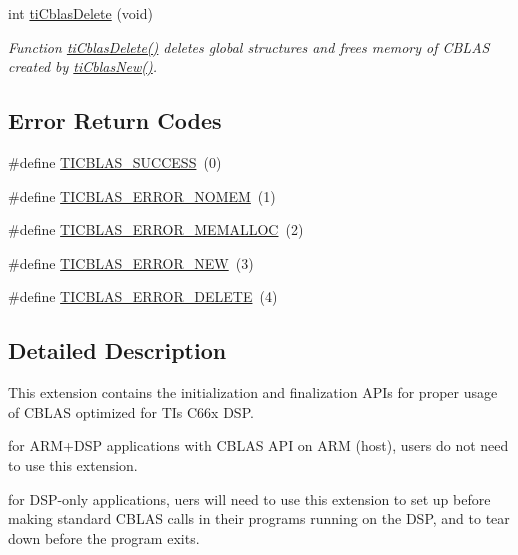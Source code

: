 \begin{DoxyCompactItemize}
int \hyperlink{group__ti__cblas__api_gad8c58ccc364daa54766963b708e2faaa}{ti\+Cblas\+Delete} (void)
\begin{DoxyCompactList}\small\item\em Function \hyperlink{group__ti__cblas__api_gad8c58ccc364daa54766963b708e2faaa}{ti\+Cblas\+Delete()} deletes global structures and frees memory of C\+B\+L\+A\+S created by \hyperlink{group__ti__cblas__api_gad9c3d0709709d5c3303988e3616fb205}{ti\+Cblas\+New()}. \end{DoxyCompactList}\end{DoxyCompactItemize}
\subsection*{Error Return Codes}
\begin{DoxyCompactItemize}
\item 
\#define \hyperlink{group__ti__cblas__api_gabbd7dc8ae77dcac7a2268d82e3dc8217}{T\+I\+C\+B\+L\+A\+S\+\_\+\+S\+U\+C\+C\+E\+S\+S}~(0)
\item 
\#define \hyperlink{group__ti__cblas__api_ga0b3f999394ff0a0849cabdca426f635f}{T\+I\+C\+B\+L\+A\+S\+\_\+\+E\+R\+R\+O\+R\+\_\+\+N\+O\+M\+E\+M}~(1)
\item 
\#define \hyperlink{group__ti__cblas__api_gac7a02b1d568f876ce4041eb2d413d9f4}{T\+I\+C\+B\+L\+A\+S\+\_\+\+E\+R\+R\+O\+R\+\_\+\+M\+E\+M\+A\+L\+L\+O\+C}~(2)
\item 
\#define \hyperlink{group__ti__cblas__api_ga1b2a55923ea5a65f606ae34f566d6d2b}{T\+I\+C\+B\+L\+A\+S\+\_\+\+E\+R\+R\+O\+R\+\_\+\+N\+E\+W}~(3)
\item 
\#define \hyperlink{group__ti__cblas__api_ga31614d76b120aa2066518325cf372ede}{T\+I\+C\+B\+L\+A\+S\+\_\+\+E\+R\+R\+O\+R\+\_\+\+D\+E\+L\+E\+T\+E}~(4)
\end{DoxyCompactItemize}


\subsection{Detailed Description}
This extension contains the initialization and finalization A\+P\+Is for proper usage of C\+B\+L\+A\+S optimized for T\+I\textquotesingle{}s C66x D\+S\+P. 


\begin{DoxyItemize}
\item for A\+R\+M+\+D\+S\+P applications with C\+B\+L\+A\+S A\+P\+I on A\+R\+M (host), users do not need to use this extension.
\item for D\+S\+P-\/only applications, uers will need to use this extension to set up before making standard C\+B\+L\+A\+S calls in their programs running on the D\+S\+P, and to tear down before the program exits. 
\end{DoxyItemize}

